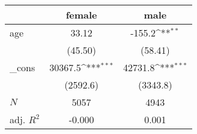 {
\def\sym#1{\ifmmode^{#1}\else\(^{#1}\)\fi}
\begin{tabular}{l*{2}{c}}
\hline\hline
            &\multicolumn{1}{c}{female}&\multicolumn{1}{c}{male}\\
\hline
age         &       33.12         &      -155.2\sym{**} \\
            &     (45.50)         &     (58.41)         \\
[1em]
\_cons      &     30367.5\sym{***}&     42731.8\sym{***}\\
            &    (2592.6)         &    (3343.8)         \\
\hline
\(N\)       &        5057         &        4943         \\
adj. \(R^{2}\)&      -0.000         &       0.001         \\
\hline\hline
\end{tabular}
}
